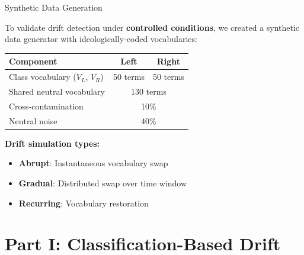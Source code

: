 \documentclass[11pt]{beamer}
\begin{document}
\begin{frame}{Synthetic Data Generation}

To validate drift detection under \textbf{controlled conditions}, we created a synthetic data generator with ideologically-coded vocabularies:

\vspace{0.3cm}

\begin{table}
\centering
\small
\begin{tabular}{lcc}
\toprule
\textbf{Component} & \textbf{Left} & \textbf{Right} \\
\midrule
Class vocabulary ($V_L$, $V_R$) & 50 terms & 50 terms \\
Shared neutral vocabulary & \multicolumn{2}{c}{130 terms} \\
Cross-contamination & \multicolumn{2}{c}{10\%} \\
Neutral noise & \multicolumn{2}{c}{40\%} \\
\bottomrule
\end{tabular}
\end{table}

\vspace{0.3cm}

\textbf{Drift simulation types:}
\begin{itemize}
    \item \textbf{Abrupt}: Instantaneous vocabulary swap
    \item \textbf{Gradual}: Distributed swap over time window
    \item \textbf{Recurring}: Vocabulary restoration
\end{itemize}

\end{frame}



\section{Part I: Classification-Based Drift}
\end{document}
